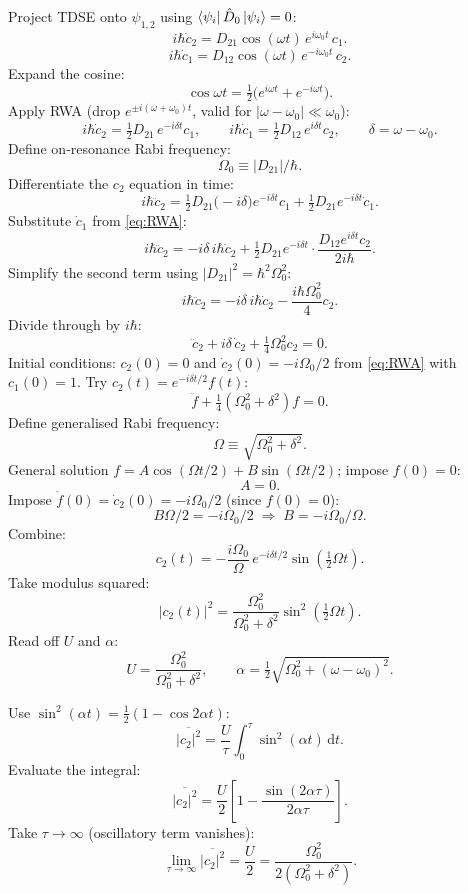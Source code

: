 \documentclass[11pt]{article}
\newcommand{\de}{\mathrm{d}}
\begin{document}
Project TDSE onto $\psi_{1,2}$ using $\bra{\psi_i}\hat D_0\ket{\psi_i}=0$:
\[ i\hbar\dot c_2=D_{21}\cos(\omega t)\,e^{i\omega_0 t}\,c_1. \]
\[ i\hbar\dot c_1=D_{12}\cos(\omega t)\,e^{-i\omega_0 t}\,c_2. \]
Expand the cosine:
\[ \cos\omega t=\tfrac{1}{2}\big(e^{i\omega t}+e^{-i\omega t}\big). \]
Apply RWA (drop $e^{\pm i(\omega+\omega_0)t}$, valid for $|\omega-\omega_0|\ll\omega_0$):
\begin{equation}
i\hbar\dot c_2=\tfrac{1}{2}D_{21}\,e^{-i\delta t}c_1,\qquad i\hbar\dot c_1=\tfrac{1}{2}D_{12}\,e^{i\delta t}c_2,\qquad \delta=\omega-\omega_0.
\label{eq:RWA}
\end{equation}
Define on-resonance Rabi frequency:
\[ \Omega_0\equiv|D_{21}|/\hbar. \]
Differentiate the $c_2$ equation in time:
\[ i\hbar\ddot c_2=\tfrac{1}{2}D_{21}\big(-i\delta\big)e^{-i\delta t}c_1+\tfrac{1}{2}D_{21}e^{-i\delta t}\dot c_1. \]
Substitute $\dot c_1$ from \eqref{eq:RWA}:
\[ i\hbar\ddot c_2=-i\delta\,i\hbar\dot c_2+\tfrac{1}{2}D_{21}e^{-i\delta t}\cdot\frac{D_{12}e^{i\delta t}c_2}{2i\hbar}. \]
Simplify the second term using $|D_{21}|^2=\hbar^2\Omega_0^2$:
\[ i\hbar\ddot c_2=-i\delta\,i\hbar\dot c_2-\frac{i\hbar\Omega_0^2}{4}c_2. \]
Divide through by $i\hbar$:
\[ \ddot c_2+i\delta\,\dot c_2+\tfrac{1}{4}\Omega_0^2 c_2=0. \]
Initial conditions: $c_2(0)=0$ and $\dot c_2(0)=-i\Omega_0/2$ from \eqref{eq:RWA} with $c_1(0)=1$. Try $c_2(t)=e^{-i\delta t/2}f(t)$:
\[ \ddot f+\tfrac{1}{4}(\Omega_0^2+\delta^2)f=0. \]
Define generalised Rabi frequency:
\[ \Omega\equiv\sqrt{\Omega_0^2+\delta^2}. \]
General solution $f=A\cos(\Omega t/2)+B\sin(\Omega t/2)$; impose $f(0)=0$:
\[ A=0. \]
Impose $\dot f(0)=\dot c_2(0)=-i\Omega_0/2$ (since $f(0)=0$):
\[ B\Omega/2=-i\Omega_0/2\;\Longrightarrow\;B=-i\Omega_0/\Omega. \]
Combine:
\begin{equation}
c_2(t)=-\frac{i\Omega_0}{\Omega}\,e^{-i\delta t/2}\sin(\tfrac{1}{2}\Omega t).
\label{eq:c2}
\end{equation}
Take modulus squared:
\[ |c_2(t)|^2=\frac{\Omega_0^2}{\Omega_0^2+\delta^2}\sin^2(\tfrac{1}{2}\Omega t). \]
Read off $U$ and $\alpha$:
\[ \boxed{\;U=\frac{\Omega_0^2}{\Omega_0^2+\delta^2},\qquad \alpha=\tfrac{1}{2}\sqrt{\Omega_0^2+(\omega-\omega_0)^2}.\;} \]

Use $\sin^2(\alpha t)=\tfrac{1}{2}(1-\cos 2\alpha t)$:
\[ \overline{|c_2|^2}=\frac{U}{\tau}\int_0^\tau\sin^2(\alpha t)\,\de t. \]
Evaluate the integral:
\[ \overline{|c_2|^2}=\frac{U}{2}\left[1-\frac{\sin(2\alpha\tau)}{2\alpha\tau}\right]. \]
Take $\tau\to\infty$ (oscillatory term vanishes):
\[ \boxed{\;\lim_{\tau\to\infty}\overline{|c_2|^2}=\frac{U}{2}=\frac{\Omega_0^2}{2(\Omega_0^2+\delta^2)}.\;} \]
\end{document}
